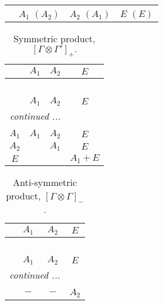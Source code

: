 \documentclass[fleqn,10pt,landscape]{article}
\begin{document}
\begin{itemize}
\begin{center}
\begin{longtable}{cccc}
 \hline \hline
\multicolumn{3}{r}{} \\ \endlastfoot

 & $ A_{1}\,\,(A_{2}) $ & $ A_{2}\,\,(A_{1}) $ & $ E\,\,(E) $ \\
\end{longtable}
\end{center}
\begin{center}
\renewcommand{\arraystretch}{1.0}
\begin{longtable}{c|ccc}
\caption{Symmetric product, $[\Gamma\otimes\Gamma']_+.$}
 \\
 \hline \hline
 & $ A_{1} $ & $ A_{2} $ & $ E $ \\ \hline \endfirsthead

\multicolumn{3}{l}{\tablename\ \thetable{}} \\
 \hline \hline
 & $ A_{1} $ & $ A_{2} $ & $ E $ \\ \hline \endhead

 \hline \hline
\multicolumn{3}{r}{\footnotesize\it continued ...} \\ \endfoot

 \hline \hline
\multicolumn{3}{r}{} \\ \endlastfoot

$ A_{1} $ & $ A_{1} $ & $ A_{2} $ & $ E $ \\
$ A_{2} $ & $  $ & $ A_{1} $ & $ E $ \\
$ E $ & $  $ & $  $ & $ A_{1} + E $ \\
\end{longtable}
\end{center}
\begin{center}
\renewcommand{\arraystretch}{1.0}
\begin{longtable}{cccc}
\caption{Anti-symmetric product, $[\Gamma\otimes\Gamma]_-$.}
 \\
 \hline \hline
 & $ A_{1} $ & $ A_{2} $ & $ E $ \\ \hline \endfirsthead

\multicolumn{3}{l}{\tablename\ \thetable{}} \\
 \hline \hline
 & $ A_{1} $ & $ A_{2} $ & $ E $ \\ \hline \endhead

 \hline \hline
\multicolumn{3}{r}{\footnotesize\it continued ...} \\ \endfoot

 \hline \hline
\multicolumn{3}{r}{} \\ \endlastfoot

$  $ & $ - $ & $ - $ & $ A_{2} $ \\
\end{longtable}
\end{center}


\end{itemize}
\end{document}
